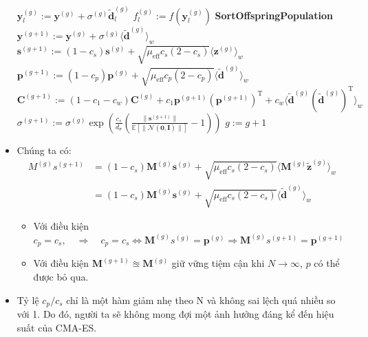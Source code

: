 \documentclass{book}
\begin{document}
\begin{itemize}
\begin{algorithm}[H]
\begin{algorithmic}[1]
            \STATE \(\mathbf{y}_l^{(g)} := \mathbf{y}^{(g)} + \sigma^{(g)}\tilde{\mathbf{d}}_l^{(g)}\)
            \STATE \(f_l^{(g)} := f(\mathbf{y}_l^{(g)})\)
            \ENDFOR
            \STATE \textbf{SortOffspringPopulation}
            \STATE \(\mathbf{y}^{(g+1)} := \mathbf{y}^{(g)} + \sigma^{(g)} \langle \tilde{\mathbf{d}}^{(g)} \rangle_w\)
            \STATE \(\mathbf{s}^{(g+1)} := (1 - c_s)\mathbf{s}^{(g)} + \sqrt{\mu_{\operatorname{eff}}c_s(2-c_s)} \langle \mathbf{z}^{(g)} \rangle_w\)
            \STATE \(\mathbf{p}^{(g+1)} := (1 - c_p)\mathbf{p}^{(g)} + \sqrt{\mu_{\operatorname{eff}}c_p(2-c_p)} \langle \tilde{\mathbf{d}}^{(g)} \rangle_w\)
            \STATE \(\mathbf{C}^{(g+1)} := (1 - c_1 - c_w)\mathbf{C}^{(g)} + c_1\mathbf{p}^{(g+1)}(\mathbf{p}^{(g+1)})^\mathrm{T} + c_w \langle \tilde{\mathbf{d}}^{(g)}(\tilde{\mathbf{d}}^{(g)})^\mathrm{T} \rangle_w\)
            \STATE \(\sigma^{(g+1)} := \sigma^{(g)} \exp \left( \frac{c_s}{d_\sigma} \left( \frac{\|\mathbf{s}^{(g+1)}\|}{\mathbb{E}[\|\mathcal{N}(\mathbf{0}, \mathbf{I})\|]} - 1 \right) \right)\)
            \STATE \(g := g + 1\)
        \end{algorithmic}
    \end{algorithm}
    \item Chúng ta có:
     \begin{equation*}
        \begin{aligned}
        M^{(g)}s^{(g+1)}&=(1-c_s)\mathbf{M}^{(g)}\mathbf{s}^{(g)} + \sqrt{\mu_{\operatorname{eff}}c_s(2-c_s)} \langle \mathbf{M}^{(g)}\tilde{\mathbf{z}}^{(g)}\rangle_w \\
        &=(1-c_s)\mathbf{M}^{(g)}\mathbf{s}^{(g)} + \sqrt{\mu_{\operatorname{eff}}c_s(2-c_s)} \langle \tilde{\mathbf{d}}^{(g)} \rangle_w
        \end{aligned}
    \end{equation*}
    \begin{itemize}
        \item[] Với điều kiện $c_p=c_s, \quad \Rightarrow \quad c_p=c_s \Leftrightarrow \mathbf{M}^{(g)}s^{(g)}=\mathbf{p}^{(g)}\Rightarrow \mathbf{M}^{(g)}s^{(g+1)}=\mathbf{p}^{(g+1)}$
        \item[] Với điều kiện $\mathbf{M}^{(g+1)}\approxeq \mathbf{M}^{(g)}$ giữ vững tiệm cận khi $N\to \infty$, $p$ có thể được bỏ qua.
    \end{itemize}
    \item Tỷ lệ $c_p/c_s$ chỉ là một hàm giảm nhẹ theo N và không sai lệch quá nhiều so với 1. Do đó, người ta sẽ không mong đợi một ảnh hưởng đáng kể đến hiệu suất của CMA-ES.

\end{itemize}
\end{document}
